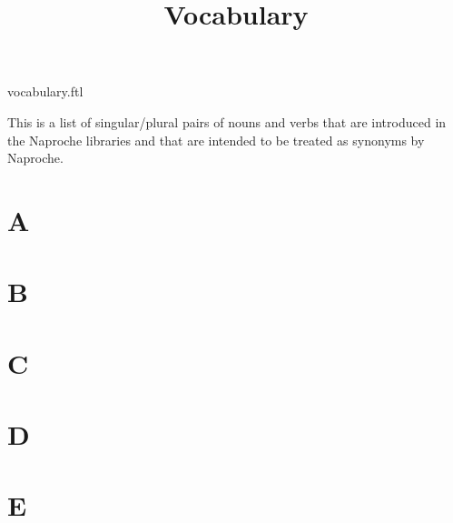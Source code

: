 \documentclass{stex}
\title{Vocabulary}
\author{}
\date{}
\begin{document}
\begin{smodule}{vocabulary.ftl}

\maketitle

\noindent This is a list of singular/plural pairs of nouns and verbs that are
introduced in the Naproche libraries and that are intended to be treated as
synonyms by Naproche.


\section*{A}

\begin{forthel}
\end{forthel}


\section*{B}

\begin{forthel}
\end{forthel}


\section*{C}

\begin{forthel}
\end{forthel}


\section*{D}

\begin{forthel}
\end{forthel}


\section*{E}


\end{smodule}
\end{document}
